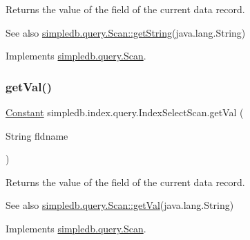 Returns the value of the field of the current data record. \begin{DoxySeeAlso}{See also}
\hyperlink{interfacesimpledb_1_1query_1_1Scan_a922e219fee53ecfa6163525f9e3ef222}{simpledb.\+query.\+Scan\+::get\+String}(java.\+lang.\+String) 
\end{DoxySeeAlso}


Implements \hyperlink{interfacesimpledb_1_1query_1_1Scan_a922e219fee53ecfa6163525f9e3ef222}{simpledb.\+query.\+Scan}.

\mbox{\label{classsimpledb_1_1index_1_1query_1_1IndexSelectScan_a2fc2cb0693d8c75ab2265b920f923439}} 
\subsubsection{\texorpdfstring{get\+Val()}{getVal()}}
{\footnotesize\ttfamily \hyperlink{classsimpledb_1_1query_1_1Constant}{Constant} simpledb.\+index.\+query.\+Index\+Select\+Scan.\+get\+Val (\begin{DoxyParamCaption}\item[{String}]{fldname }\end{DoxyParamCaption})\hspace{0.3cm}{\ttfamily [inline]}}

Returns the value of the field of the current data record. \begin{DoxySeeAlso}{See also}
\hyperlink{interfacesimpledb_1_1query_1_1Scan_aca80bca2857c983a88834bf6c01ee5ca}{simpledb.\+query.\+Scan\+::get\+Val}(java.\+lang.\+String) 
\end{DoxySeeAlso}


Implements \hyperlink{interfacesimpledb_1_1query_1_1Scan_aca80bca2857c983a88834bf6c01ee5ca}{simpledb.\+query.\+Scan}.

\mbox{\label{classsimpledb_1_1index_1_1query_1_1IndexSelectScan_a5ab76aa38dcde3d563d88753c9c171ce}} 

